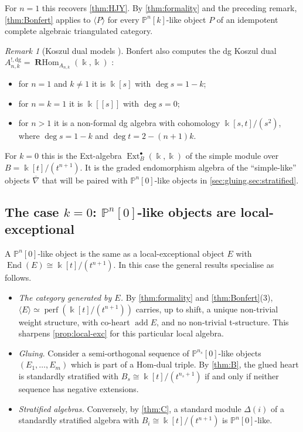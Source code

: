 \documentclass[11pt,reqno]{amsart}
\theoremstyle{plain}
\theoremstyle{definition}
\theoremstyle{remark}
\newtheorem{remark}[theorem]{Remark}
\newcommand{\kk}{\Bbbk}
\DeclareMathOperator{\End}{End}
\DeclareMathOperator{\Ext}{Ext}
\DeclareMathOperator{\add}{add}
\DeclareMathOperator{\RHom}{\mathbf{R}Hom}
\newcommand{\thick}[1]{\langle #1\rangle}
\newcommand{\Pn}[2]{\mathbb{P}^{#1}[#2]}
\newcommand{\nablabar}{\overline{\nabla}}
\begin{document}
For $n=1$ this recovers \cref{thm:HJY}. By \cref{thm:formality} and the preceding remark, \cref{thm:Bonfert} applies to $\thick P$ for every $\Pn nk$-like object $P$ of an idempotent complete algebraic triangulated category.

\begin{remark}[{Koszul dual models \cite[\S4]{Bonf26}}]\label{rem:Bonfert-Koszul}
Bonfert also computes the dg Koszul dual $A_{n,k}^{!,\mathrm{dg}}=\RHom_{A_{n,k}}(\kk,\kk)$ \cite[Thm.~4.9, Props.~4.11 and~4.12]{Bonf26}:
\begin{itemize}
\item for $n=1$ and $k\ne1$ it is $\kk[s]$ with $\deg s=1-k$;
\item for $n=k=1$ it is $\kk[[s]]$ with $\deg s=0$;
\item for $n>1$ it is a non-formal dg algebra with cohomology $\kk[s,t]/(s^2)$, where $\deg s=1-k$ and $\deg t=2-(n+1)k$.
\end{itemize}
For $k=0$ this is the Ext-algebra $\Ext^\bullet_B(\kk,\kk)$ of the simple module over $B=\kk[t]/(t^{n+1})$. It is the graded endomorphism algebra of the ``simple-like'' objects $\nablabar$ that will be paired with $\Pn n0$-like objects in \cref{sec:gluing,sec:stratified}.
\end{remark}

\subsection{The case \texorpdfstring{$k=0$}{k=0}: \texorpdfstring{$\mathbb{P}^n[0]$}{Pn[0]}-like objects are local-exceptional}\label{sec:P-zero}

A $\Pn n0$-like object is the same as a local-exceptional object $E$ with $\End(E)\cong\kk[t]/(t^{n+1})$. In this case the general results specialise as follows.
\begin{itemize}
\item \emph{The category generated by $E$.} By \cref{thm:formality} and \cref{thm:Bonfert}(3), $\thick E\simeq\operatorname{perf}(\kk[t]/(t^{n+1}))$ carries, up to shift, a unique non-trivial weight structure, with co-heart $\add E$, and no non-trivial t-structure. This sharpens \cref{prop:local-exc} for this particular local algebra.
\item \emph{Gluing.} Consider a semi-orthogonal sequence of $\Pn{n_s}0$-like objects $(E_1,\dots,E_m)$ which is part of a Hom-dual triple. By \cref{thm:B}, the glued heart is standardly stratified with $B_s\cong\kk[t]/(t^{n_s+1})$ if and only if neither sequence has negative extensions.
\item \emph{Stratified algebras.} Conversely, by \cref{thm:C}, a standard module $\Delta(i)$ of a standardly stratified algebra with $B_i\cong\kk[t]/(t^{n+1})$ is $\Pn n0$-like.
\end{itemize}
\end{document}
